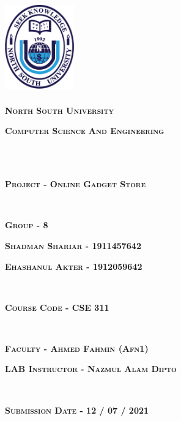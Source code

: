 \documentclass[a4paper,titlepage,12pt]{article}
\begin{document}
\pagestyle{empty}
\begin{center}
\includegraphics[width=3cm,height=4cm]{nsu.png}
\end{center}
\begin{center}
{\textbf{\LARGE \textsc{North South University}}}
\end{center}
\begin{center}
{\Large \textsc{\textbf{Computer Science And Engineering}}}
\end{center}
~\\ \\
\begin{center}
{\LARGE \textsc{\textbf{Project - Online Gadget Store}}}
\end{center}
~\\ 
\begin{center}
{\Large \textsc{\textbf{Group - 8}}}
\end{center}
\begin{center}
{\Large \textsc{\textbf{Shadman Shariar - 1911457642}}}
\end{center}

\begin{center}
{\Large \textsc{\textbf{Ehashanul Akter - 1912059642}}}
\end{center}
~\
\begin{center}
{\Large \textsc{\textbf{Course Code - CSE 311 }}}
\end{center}
~\
\begin{center}
{\Large \textsc{\textbf{Faculty - Ahmed Fahmin (Afn1) }}}
\end{center}
\begin{center}
{\Large \textsc{\textbf{LAB Instructor - Nazmul Alam Dipto }}}
\end{center}
~\
\begin{center}
{\Large \textsc{\textbf{Submission Date - 12 /  07 / 2021 }}}
\end{center}
\newpage
\cleardoublepage

\end{document}
